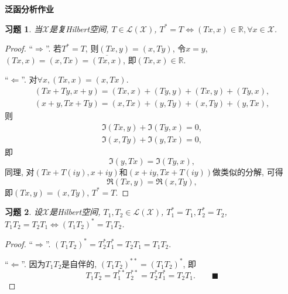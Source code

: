 \documentclass[a4paper,oneside,12pt]{ctexart}
\theoremstyle{plain}
\newtheorem{exercise}{习题}
\theoremstyle{nonumberplain}
\theoremstyle{nonumberplain}
\newtheorem{proof}{证明}
\newcommand{\R}{\mathbb{R}}
\newcommand{\sX}{\mathscr{X}}
\newcommand{\sL}{\mathscr{L}}
\begin{document}
    
    \begin{center}
        \bfseries\LARGE
        泛函分析作业
    \end{center}

    \begin{exercise}
        \label{ex:1 on note}
        当$\sX$是复Hilbert空间, $T\in\sL(\sX)$, $T^\ast=T\Leftrightarrow (Tx,x)\in\R,\forall x\in\sX$.
    \end{exercise}

    \begin{proof}
        ``$\Rightarrow$''. 若$T^\ast=T$, 则$(Tx,y)=(x,Ty)$, 令$x=y$, $(Tx,x)=(x,Tx)=\overline{(Tx,x)}$, 即$(Tx,x)\in\R$.

        ``$\Leftarrow$''. 对$\forall x,(Tx,x)=(x,Tx)$.
        \begin{gather*}
            (Tx+Ty,x+y)=(Tx,x)+(Ty,y)+(Tx,y)+(Ty,x),\\
            (x+y,Tx+Ty)=(x,Tx)+(y,Ty)+(x,Ty)+(y,Tx),
        \end{gather*}
        则
        \begin{gather*}
            \Im(Tx,y)+\Im(Ty,x)=0,\\
            \Im(x,Ty)+\Im(y,Tx)=0,
        \end{gather*}
        即
        \begin{equation*}
            \Im(y,Tx)=\Im(Ty,x),
        \end{equation*}
        同理, 对$(Tx+T(iy),x+iy)$和$(x+iy,Tx+T(iy))$做类似的分解, 可得 
        \begin{equation*}
            \Re(Tx,y)=\Re(x,Ty),
        \end{equation*}
        即$(Tx,y)=(x,Ty)$, $T^\ast=T$.
    \end{proof}

    \begin{exercise}
        \label{ex:2 on note}
        设$\sX$是Hilbert空间, $T_1,T_2\in\sL(\sX)$, $T_1^\ast=T_1,T_2^\ast=T_2$, $T_1T_2=T_2T_1\Leftrightarrow (T_1T_2)^\ast=T_1T_2$.
    \end{exercise}

    \begin{proof}
        ``$\Rightarrow$''. $(T_1T_2)^\ast=T_2^\ast T_1^\ast=T_2T_1=T_1T_2$.

        ``$\Leftarrow$''. 因为$T_1T_2$是自伴的, $(T_1T_2)^{\ast\ast}=(T_1T_2)^\ast$, 即 
        \begin{equation*}
            T_1T_2=T_1^{\ast\ast}T_2^{\ast\ast}=T_2^\ast T_1^\ast=T_2T_1.\qquad \blacksquare
        \end{equation*}
    \end{proof}
\end{document}
